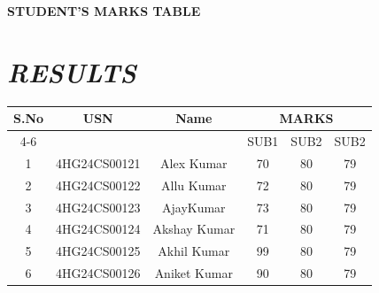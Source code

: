 \documentclass[12pt,a4paper]{article}
\begin{document}
\begin{center}
\LARGE{\textbf{STUDENT'S MARKS TABLE}}
\end{center}
\section*{\textit{RESULTS}}
\begin{tabular}{|c|c|c|c|c|c|}
\hline
\multirow{2}{*}{S.No} & \multirow{2}{*}{USN} & \multirow{2}{*}{Name} & \multicolumn{3}{c|}{MARKS }\\
\cline{4-6}
& & & SUB1 & SUB2 & SUB2\\
\hline
1 & 4HG24CS00121 & Alex Kumar & 70 & 80 &79\\
\hline
2 & 4HG24CS00122 & Allu Kumar & 72& 80 &79\\
\hline
3 & 4HG24CS00123 & AjayKumar & 73 & 80 &79\\
\hline
4 & 4HG24CS00124 & Akshay Kumar & 71 & 80 &79\\
\hline
5 & 4HG24CS00125 & Akhil Kumar & 99 & 80 &79\\
\hline
6 & 4HG24CS00126 & Aniket Kumar & 90 & 80 &79\\
\hline
\end{tabular}
\end{document}
